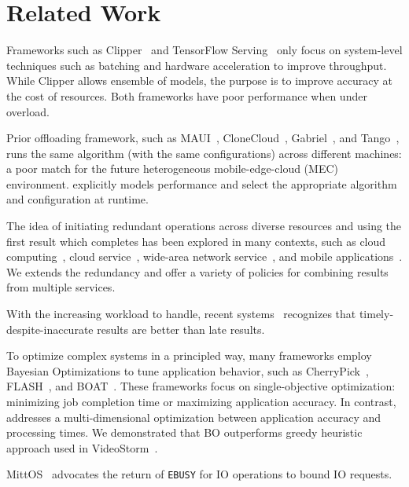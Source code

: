 \newpage

\section{Related Work}
\label{sec:related-work}

 Frameworks such as Clipper~\cite{crankshaw2017clipper} and
TensorFlow Serving~\cite{tensorflow2017serving} only focus on system-level
techniques such as batching and hardware acceleration to improve
throughput. While Clipper allows ensemble of models, the purpose is to improve
accuracy at the cost of resources. Both frameworks have poor performance when
under overload.

 Prior offloading framework, such as
MAUI~\cite{cuervo2010maui}, CloneCloud~\cite{chun2011clonecloud},
Gabriel~\cite{ha2014towards}, and Tango~\cite{gordon2015accelerating}, runs the
same algorithm (with the same configurations) across different machines: a poor
match for the future heterogeneous mobile-edge-cloud (MEC)
environment. \sysname{} explicitly models performance and select the appropriate
algorithm and configuration at runtime.

 The idea of initiating redundant operations
across diverse resources and using the first result which completes has been
explored in many contexts, such as cloud
computing~\cite{ananthanarayanan2013effective}, cloud
service~\cite{dean2013tail}, wide-area network service~\cite{vulimiri2013low},
and mobile applications~\cite{gordon2015accelerating}. We extends the redundancy
and offer a variety of policies for combining results from multiple services.

 With the increasing workload to handle, recent
systems~\cite{agarwal2013blinkdb, rabkin2014aggregation, zhang2017live}
recognizes that timely-despite-inaccurate results are better than late
results.

 To optimize complex systems in a principled way,
many frameworks employ Bayesian Optimizations to tune application behavior, such
as CherryPick~\cite{alipourfard2017cherrypick}, FLASH~\cite{zhang2016flash}, and
BOAT~\cite{dalibard2017boat}. These frameworks focus on single-objective
optimization: minimizing job completion time or maximizing application
accuracy. In contrast, \sysname{} addresses a multi-dimensional optimization
between application accuracy and processing times. We demonstrated that BO
outperforms greedy heuristic approach used in VideoStorm~\cite{zhang2017live}.

 MittOS~\cite{hao2017mittos} advocates the return of
\texttt{EBUSY} for IO operations to bound IO requests.

